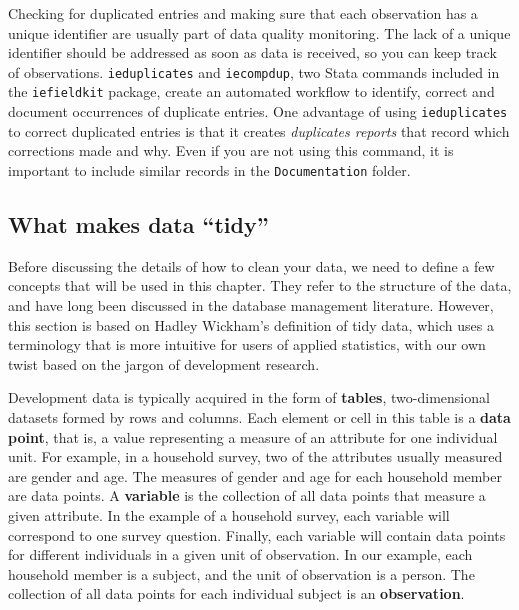 Checking for duplicated entries and making sure that each observation has a unique identifier are usually part of data quality monitoring.
The lack of a unique identifier should be addressed as soon as data is received,
so you can keep track of observations.
\texttt{ieduplicates} and \texttt{iecompdup},
two Stata commands included in the \texttt{iefieldkit}
package,
create an automated workflow to identify, correct and document
occurrences of duplicate entries.
One advantage of using \texttt{ieduplicates} 
to correct duplicated entries is that it creates \textit{duplicates reports}
that record which corrections made and why.
Even if you are not using this command,
it is important to include similar records in the \texttt{Documentation} folder.

\subsection{What makes data ``tidy''}

Before discussing the details of how to clean your data,
we need to define a few concepts that will be used in this chapter.
They refer to the structure of the data,
and have long been discussed in the database management literature.
However, this section is based on Hadley Wickham's definition of tidy data,\cite{tidy-data}
which uses a terminology that is more intuitive for users of applied statistics,
with our own twist based on the jargon of development research.

Development data is typically acquired in the form of \textbf{tables},
two-dimensional datasets formed by rows and columns.
Each element or cell in this table is a \textbf{data point}, that is,
a value representing a measure of an attribute for one individual unit.
For example, in a household survey,
two of the attributes usually measured are gender and age.
The measures of gender and age for each household member are data points.
A \textbf{variable}
 is the collection of all data points that measure a given attribute.
In the example of a household survey,
each variable will correspond to one survey question.
Finally, each variable will contain data points for different individuals in a given unit of observation.
In our example, each household member is a subject, and the unit of observation is a person.
The collection of all data points for each individual subject is an 
\textbf{observation}.

